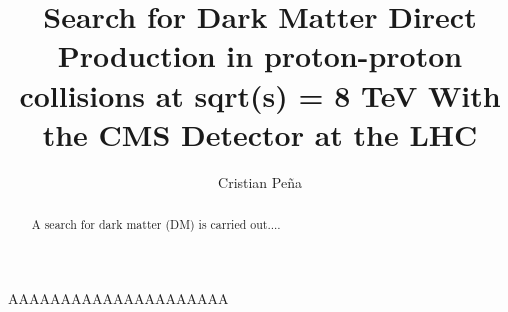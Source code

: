 \documentclass[draftfoot,preprint]{cit_thesis}
\begin{document}
\title{Search for Dark Matter Direct Production in proton-proton collisions at sqrt(s) = 8 TeV With the CMS Detector at the LHC}
\author{Cristian Pe\~na}

\maketitle

\begin{abstract}
A search for dark matter (DM) is carried out....
\end{abstract}


AAAAAAAAAAAAAAAAAAAAA~\cite{vandeHulst,Rubin:1980zd}





{}

\end{document}
